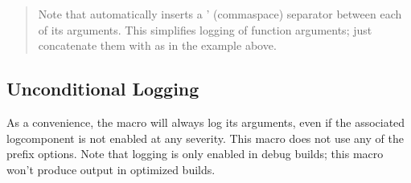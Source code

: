 \documentclass[letterpaper,10pt,english]{sphinxmanual}
\renewcommand{\sphinxcode}[1]{\texttt{\small{#1}}}
\begin{document}
\begin{quote}
Note that \sphinxcode{} automatically inserts a \textasciigrave{}\sphinxcode{\sphinxupquote{,}}’
(comma\sphinxhyphen{}space) separator between each of its arguments.
This simplifies logging of function arguments;
just concatenate them with \sphinxcode{\sphinxupquote{\textless{}\textless{}}} as in the example above.
\end{quote}


\subsection{Unconditional Logging}
\label{\detokenize{logging:unconditional-logging}}
As a convenience, the \sphinxcode{} macro will always log its
arguments, even if the associated log\sphinxhyphen{}component is not enabled at any
severity.  This macro does not use any of the prefix options.  Note that
logging is only enabled in debug builds; this macro won’t produce
output in optimized builds.
\end{document}
